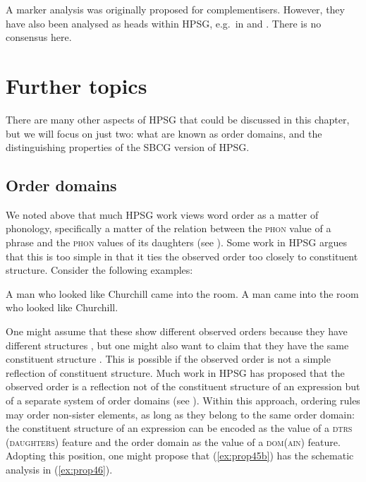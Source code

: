 \documentclass[output=paper
	        ,collection
	        ,collectionchapter
 	        ,biblatex
                ,babelshorthands
                ,newtxmath
                ,draftmode
                ,colorlinks, citecolor=brown
]{langscibook}
\begin{document}
A marker analysis was originally proposed for complementisers. However, they have also been analysed as heads within HPSG, e.g.\ in \citet[456--458]{Sag97a} and \citet[Section~2.8]{GSag2000a-u}. There is no consensus here.


\section{Further topics}\label{sec:prop7}
\label{prop:sec-further-topics}

There are many other aspects of HPSG that could be discussed in this chapter, but we will focus on just two: what are known as order domains, and the distinguishing properties of the SBCG version of HPSG.

\subsection{Order domains}\label{sec:prop7.1}

We noted above that much HPSG work views word order as a matter of phonology, specifically a matter of the relation between the \textsc{phon} value of a phrase and the \textsc{phon} values of its daughters (see ). Some work in HPSG argues that this is too simple in that it ties the observed order too closely to constituent structure. Consider the following examples:

\eal\label{ex:prop45}
\ex\label{ex:prop45a}
A man who looked like Churchill came into the room.
\ex\label{ex:prop45b}
A man came into the room who looked like Churchill.
\zl

\noindent
One might assume that these show different observed orders because they have different structures
\citep{Kiss2005a}, but one might also want to claim that they have the same constituent structure
\citep{KP95a}. This is possible if the observed order is not a simple reflection of constituent
structure. Much work in HPSG has proposed that the observed order is a reflection not of the
constituent structure of an expression but of a separate system of order domains (see
\citealp{Reape94a,Babel,Kathol2000a}). Within this approach, ordering rules may order non-sister
elements, as long as they belong to the same order domain: the constituent structure of an
expression can be encoded as the value of a \textsc{dtrs (daughters)} feature and the order domain
as the value of a \textsc{dom(ain)} feature. Adopting this position, one might propose that
(\ref{ex:prop45b}) has the schematic analysis in (\ref{ex:prop46}). 
\end{document}
